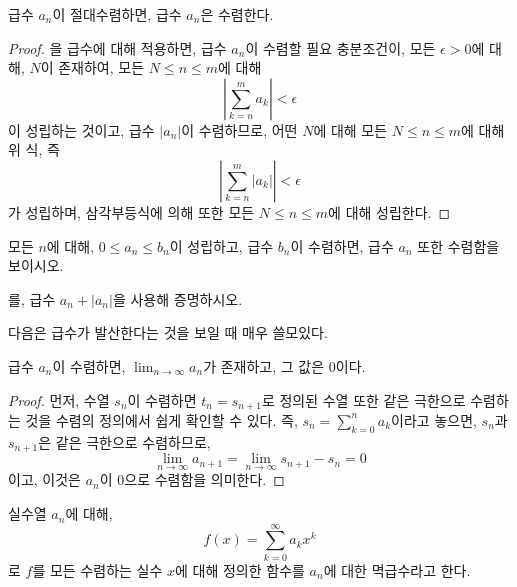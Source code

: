 \begin{theorem}
\label{thm:absconvseries}
    급수 $a_n$이 절대수렴하면, 급수 $a_n$은 수렴한다.
\end{theorem}
\begin{proof}
    을 급수에 대해 적용하면, 급수 $a_n$이 수렴할 필요 충분조건이, 모든 $\epsilon > 0$에 대해, $N$이 존재하여, 모든 $N \leq n \leq m$에 대해
    \begin{equation}
    \label{eq:cauchyseries}
        \left| \sum_{k = n}^m a_k \right| < \epsilon
    \end{equation}
    이 성립하는 것이고, 급수 $|a_n|$이 수렴하므로, 어떤 $N$에 대해 모든 $N \leq n \leq m$에 대해 위 식, 즉
    \begin{equation*}
        \left| \sum_{k = n}^m |a_k| \right| < \epsilon
    \end{equation*}
    가 성립하며, 삼각부등식에 의해  또한 모든 $N \leq n \leq m$에 대해 성립한다.
\end{proof}

\begin{exercise}[비교판정법]
 
    모든 $n$에 대해, $0 \leq a_n \leq b_n$이 성립하고, 급수 $b_n$이 수렴하면, 급수 $a_n$ 또한 수렴함을 보이시오.
\end{exercise}

\begin{exercise}
를, 급수 $a_n + |a_n|$을 사용해 증명하시오.
\end{exercise}

다음은 급수가 발산한다는 것을 보일 때 매우 쓸모있다.
\begin{theorem}
    급수 $a_n$이 수렴하면, $\lim_{n \to \infty} a_n$가 존재하고, 그 값은 $0$이다.
\end{theorem}
\begin{proof}
    먼저, 수열 $s_n$이 수렴하면 $t_n = s_{n + 1}$로 정의된 수열 또한 같은 극한으로 수렴하는 것을 수렴의 정의에서 쉽게 확인할 수 있다.
    즉, $s_n = \sum_{k = 0}^n a_k$이라고 놓으면, $s_n$과 $s_{n + 1}$은 같은 극한으로 수렴하므로,
    \begin{equation*}
        \lim_{n \to \infty} a_{n + 1} = \lim_{n \to \infty} s_{n + 1} - s_n = 0
    \end{equation*}
    이고, 이것은 $a_n$이 $0$으로 수렴함을 의미한다.
\end{proof}

\begin{definition}
    실수열 $a_n$에 대해,
    \begin{equation*}
        f(x) = \sum_{k = 0}^\infty a_k x^k
    \end{equation*}
    로 $f$를 모든 수렴하는 실수 $x$에 대해 정의한 함수를 $a_n$에 대한 멱급수라고 한다.
\end{definition}

